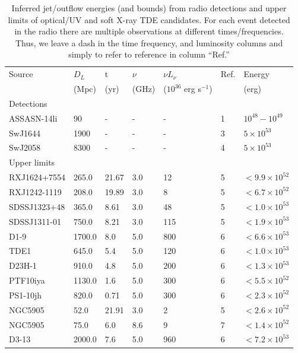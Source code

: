 \documentclass[usenatbib,fleqn]{mnras}
\begin{document}
\begin{table}
\begin{threeparttable}
  \caption{\label{tab:enConstr} Inferred jet/outflow energies (and
    bounds) from radio detections and upper limits of optical/UV and
    soft X-ray TDE candidates. For each event detected in the radio
    there are multiple observations at different
    times/frequencies. Thus, we leave a dash in the time frequency,
    and luminosity columns and simply to refer to reference in column ``Ref.''}
\begin{tabular*}{1.5\columnwidth}{lllllll}
\hline
Source & $D_L$ & t & $\nu$ & $\nu L_{\nu}$ & Ref. & Energy\\
& (Mpc) & (yr) & (GHz) & ($10^{36}$ erg s$^{-1}$) & & (erg) \\
\hline
Detections \\
\hline
ASSASN-14li & 90 & - & - & - & 1 &  $10^{48}-10^{49}$\\
SwJ1644 & 1900 & - & - & - &  3  & $5\times 10^{53}$\\
SwJ2058 & 8300  & - & - & - & 4 & $5\times 10^{53}$\\ 
\hline 
Upper limits & \\
\hline
RXJ1624+7554 & 265.0 & 21.67 & 3.0 & 12 & 5 & $< 9.9 \times 10^{ 52 }$ \\
RXJ1242-1119 & 208.0 & 19.89 & 3.0 & 8 & 5 & $< 6.7 \times 10^{ 52 }$ \\
SDSSJ1323+48 & 365.0 & 8.61 & 3.0 & 48 & 5 & $< 1.0 \times 10^{ 53 }$ \\
SDSSJ1311-01 & 750.0 & 8.21 & 3.0 & 115 & 5 & $< 1.9 \times 10^{ 53 }$ \\
D1-9 & 1700.0 & 8.0 & 5.0 & 800 & 6 & $< 6.6 \times 10^{ 53 }$ \\
TDE1 & 645.0 & 5.4 & 5.0 & 120 & 6 & $< 1.0 \times 10^{ 53 }$ \\
D23H-1 & 910.0 & 4.8 & 5.0 & 200 & 6 & $< 1.3 \times 10^{ 53 }$ \\
PTF10iya & 1130.0 & 1.6 & 5.0 & 300 & 6 & $< 5.5 \times 10^{ 52 }$ \\
PS1-10jh & 820.0 & 0.71 & 5.0 & 300 & 6 & $< 2.3 \times 10^{ 52 }$ \\
NGC5905 & 52.0 & 21.91 & 3.0 & 2 & 5 & $< 2.6 \times 10^{ 52 }$ \\
NGC5905 & 75.0 & 6.0 & 8.6 & 9 & 7 & $< 1.4 \times 10^{ 52 }$ \\
D3-13 & 2000.0 & 7.6 & 5.0 & 960 & 6 & $< 7.2 \times 10^{ 53 }$ \\

\end{tabular*}
\end{threeparttable}
\end{table}
\end{document}
